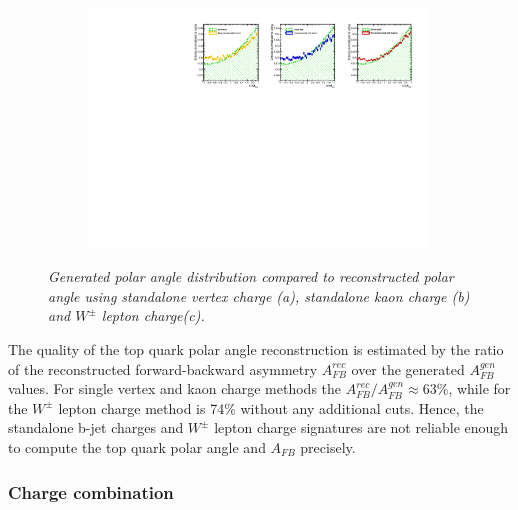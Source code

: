 \begin{figure}
\begin{subfigure}{0.33\textwidth}
		\includegraphics[clip, trim=13.6cm 0cm 0.4cm 0.cm,width=0.99\textwidth]{ILD/plots/one-charge.pdf}
		\caption{\label{fig:OneCharge_c_3} }
	\end{subfigure}
	\caption{\sl Generated polar angle distribution compared to reconstructed polar angle using standalone vertex charge (a), standalone kaon charge (b) and $W^\pm$ lepton charge(c). }
	
	\label{fig:OneCharge_3}
\end{figure}

The quality of the top quark polar angle reconstruction is estimated by the ratio of the reconstructed forward-backward asymmetry $A_{FB}^{rec}$ over the generated $A^{gen}_{FB}$ values.
For single vertex and kaon charge methods the $A_{FB}^{rec}/A^{gen}_{FB} \approx 63\%$, while for the $W^\pm$ lepton charge method is 74\% without any additional cuts. 
Hence, the standalone b-jet charges and $W^\pm$ lepton charge signatures are not reliable enough to compute the top quark polar angle and $A_{FB}$ precisely. 
\subsubsection{Charge combination}

